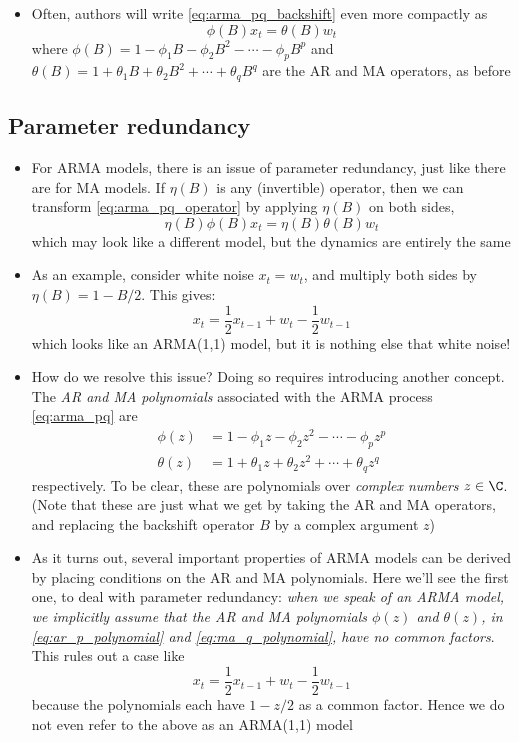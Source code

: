 \documentclass{article}
\begin{document}
\begin{itemize}
\item Often, authors will write \eqref{eq:arma_pq_backshift} even more compactly
  as    
  \begin{equation}
  \label{eq:arma_pq_operator}
  \phi(B) x_t = \theta(B) w_t  
  \end{equation}
  where $\phi(B) = 1 - \phi_1 B - \phi_2 B^2 - \cdots - \phi_p B^p$ and
  $\theta(B) = 1 + \theta_1 B + \theta_2 B^2 + \cdots + \theta_q B^q$ are the AR 
  and MA operators, as before 
\end{itemize}

\subsection{Parameter redundancy}

\begin{itemize}
\item For ARMA models, there is an issue of parameter redundancy, just like
  there are for MA models. If $\eta(B)$ is any (invertible) operator, then we
  can transform \eqref{eq:arma_pq_operator} by applying $\eta(B)$ on both sides,  
  \[
  \eta(B) \phi(B) x_t = \eta(B) \theta(B) w_t  
  \]
  which may look like a different model, but the dynamics are entirely the
  same  

\item As an example, consider white noise $x_t = w_t$, and multiply both sides
  by $\eta(B) = 1 - B/2$. This gives:
  \[
  x_t = \frac{1}{2} x_{t-1} + w_t - \frac{1}{2} w_{t-1}
  \]
  which looks like an ARMA(1,1) model, but it is nothing else that white noise!
 
\item How do we resolve this issue? Doing so requires introducing another
  concept. The \emph{AR and MA polynomials} associated with the ARMA process
  \eqref{eq:arma_pq} are 
  \begin{align}
  \label{eq:ar_p_polynomial}
  \phi(z) &= 1 - \phi_1 z - \phi_2 z^2 - \cdots - \phi_p z^p \\
  \label{eq:ma_q_polynomial}
  \theta(z) &= 1 + \theta_1 z + \theta_2 z^2 + \cdots + \theta_q z^q
  \end{align}
  respectively. To be clear, these are polynomials over \emph{complex numbers}
  $z \in \C$. (Note that these are just what we get by taking the AR and MA
  operators, and replacing the backshift operator $B$ by a complex argument $z$) 

\item As it turns out, several important properties of ARMA models can be 
  derived by placing conditions on the AR and MA polynomials. Here we'll see the
  first one, to deal with parameter redundancy: \emph{when we speak of an ARMA
    model, we implicitly assume that the AR and MA polynomials $\phi(z)$ and
    $\theta(z)$, in \eqref{eq:ar_p_polynomial} and \eqref{eq:ma_q_polynomial},
    have no common factors}. This rules out a case like   
  \[
  x_t = \frac{1}{2} x_{t-1} + w_t - \frac{1}{2} w_{t-1}
  \]
  because the polynomials each have $1-z/2$ as a common factor. Hence we do not  
  even refer to the above as an ARMA(1,1) model
\end{itemize}
\end{document}
